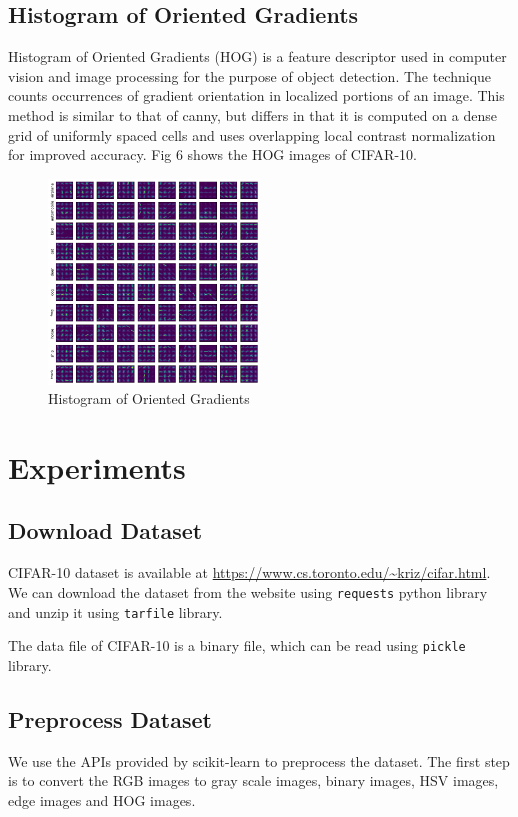 \documentclass[11pt]{article}
\begin{document}
\subsection{Histogram of Oriented Gradients}
Histogram of Oriented Gradients (HOG) is a feature descriptor used in computer vision and image processing for the purpose of object detection. 
The technique counts occurrences of gradient orientation in localized portions of an image. 
This method is similar to that of canny, but differs in that it is computed on a dense grid of uniformly spaced cells and uses overlapping local contrast normalization for improved accuracy.
Fig 6 shows the HOG images of CIFAR-10.

\begin{figure}[h]
    \centering
    \includegraphics[width=0.5\textwidth]{hog.png}
    \caption{Histogram of Oriented Gradients}
    \label{fig:hog}
\end{figure}
\section{Experiments}
\subsection{Download Dataset}
CIFAR-10 dataset is available at \url{https://www.cs.toronto.edu/~kriz/cifar.html}. We can download the dataset from the website using \verb|requests| python library and unzip it using
\verb|tarfile| library. 

The data file of CIFAR-10 is a binary file, which can be read using \verb|pickle| library. 

\subsection{Preprocess Dataset}

We use the APIs provided by scikit-learn to preprocess the dataset. The first step is to convert the RGB images to gray scale images, binary images, HSV images, edge images and HOG images.
\end{document}
